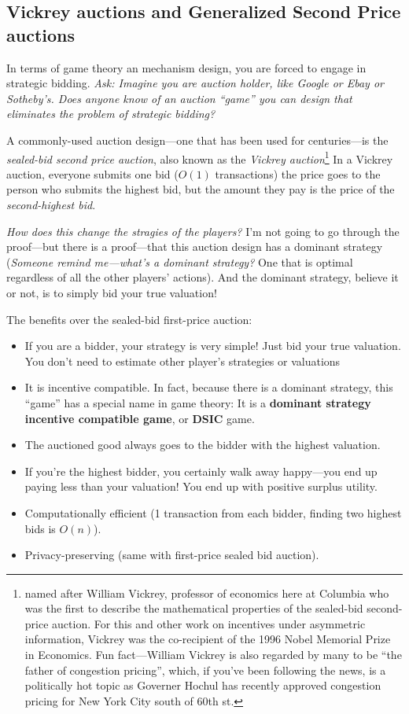 \documentclass[11pt]{article}
\begin{document}
\subsection{Vickrey auctions and Generalized Second Price auctions}

In terms of game theory an mechanism design, you are forced to engage in strategic bidding. {\it Ask: Imagine you are auction holder, like Google or Ebay or Sotheby's. Does anyone know of an auction ``game'' you can design that eliminates the problem of strategic bidding?}

A commonly-used auction design---one that has been used for centuries---is the {\it sealed-bid second price auction}, also known as the {\it Vickrey auction}\footnote{named after William Vickrey, professor of economics here at Columbia who was the first to describe the mathematical properties of the sealed-bid second-price auction. For this and other work on incentives under asymmetric information, Vickrey was the co-recipient of the 1996 Nobel Memorial Prize in Economics. Fun fact---William Vickrey is also regarded by many to be ``the father of congestion pricing'', which, if you've been following the news, is a politically hot topic as Governer Hochul has recently approved congestion pricing for New York City south of 60th st. }
In a Vickrey auction, everyone submits one bid ($O(1)$ transactions) the price goes to the person who submits the highest bid, but the amount they pay is the price of the {\it second-highest bid}.

{\it How does this change the stragies of the players?} I'm not going to go through the proof---but there is a proof---that this auction design has a dominant strategy ({\it Someone remind me---what's a dominant strategy?} One that is optimal regardless of all the other players' actions). And the dominant strategy, believe it or not, is to simply bid your true valuation! 

The benefits over the sealed-bid first-price auction:
\begin{itemize}
    \item If you are a bidder, your strategy is very simple! Just bid your true valuation. You don't need to estimate other player's strategies or valuations
    \item It is incentive compatible. In fact, because there is a dominant strategy, this ``game'' has a special name in game theory: It is a {\bf dominant strategy incentive compatible game}, or {\bf DSIC} game. 
    \item The auctioned good always goes to the bidder with the highest valuation.
    \item If you're the highest bidder, you certainly walk away happy---you end up paying less than your valuation! You end up with positive surplus utility. 
    \item Computationally efficient (1 transaction from each bidder, finding two highest bids is $O(n)$).
    \item Privacy-preserving (same with first-price sealed bid auction).
\end{itemize}
\end{document}
